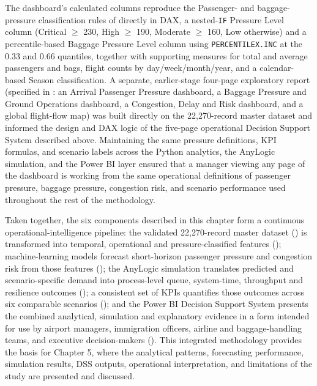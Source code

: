 The dashboard's calculated columns reproduce the Passenger- and baggage-pressure classification rules of  directly in DAX, a nested-\texttt{IF} Pressure Level column (Critical $\geq$ 230, High $\geq$ 190, Moderate $\geq$ 160, Low otherwise) and a percentile-based Baggage Pressure Level column using \texttt{PERCENTILEX.INC} at the 0.33 and 0.66 quantiles, together with supporting measures for total and average passengers and bags, flight counts by day/week/month/year, and a calendar-based Season classification. A separate, earlier-stage four-page exploratory report (specified in : an Arrival Passenger Pressure dashboard, a Baggage Pressure and Ground Operations dashboard, a Congestion, Delay and Risk dashboard, and a global flight-flow map) was built directly on the 22,270-record master dataset and informed the design and DAX logic of the five-page operational Decision Support System described above. Maintaining the same pressure definitions, KPI formulas, and scenario labels across the Python analytics, the AnyLogic simulation, and the Power BI layer ensured that a manager viewing any page of the dashboard is working from the same operational definitions of passenger pressure, baggage pressure, congestion risk, and scenario performance used throughout the rest of the methodology.

Taken together, the six components described in this chapter form a continuous operational-intelligence pipeline: the validated 22,270-record master dataset () is transformed into temporal, operational and pressure-classified features (); machine-learning models forecast short-horizon passenger pressure and congestion risk from those features (); the AnyLogic simulation translates predicted and scenario-specific demand into process-level queue, system-time, throughput and resilience outcomes (); a consistent set of KPIs quantifies those outcomes across six comparable scenarios (); and the Power BI Decision Support System presents the combined analytical, simulation and explanatory evidence in a form intended for use by airport managers, immigration officers, airline and baggage-handling teams, and executive decision-makers (). This integrated methodology provides the basis for Chapter 5, where the analytical patterns, forecasting performance, simulation results, DSS outputs, operational interpretation, and limitations of the study are presented and discussed.